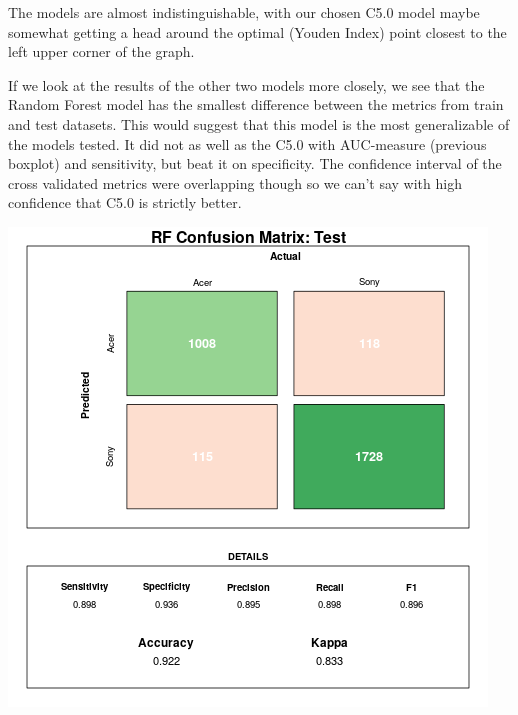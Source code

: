 \documentclass[12pt,a4paper,leqno]{report}
\theoremstyle{plain}
\theoremstyle{definition}
\theoremstyle{remark}
\begin{document}
The models are almost indistinguishable, with our chosen C5.0 model maybe somewhat getting a head around
the optimal (Youden Index) point closest to the left upper corner of the graph.

If we look at the results of the other two models more closely, we see that the Random Forest
model has the smallest difference between the metrics from train and test datasets. This
would suggest that this model is the most generalizable of the models tested. It did not
as well as the C5.0 with AUC-measure (previous boxplot) and sensitivity, but beat it on
specificity. The confidence interval of the cross validated metrics were overlapping though
so we can't say with high confidence that C5.0 is strictly better.

\bigskip
{
    \centering
    \includegraphics[width=\textwidth,height=\textheight,keepaspectratio]{cm_rf.png}
    \par
}
\bigskip
\end{document}

